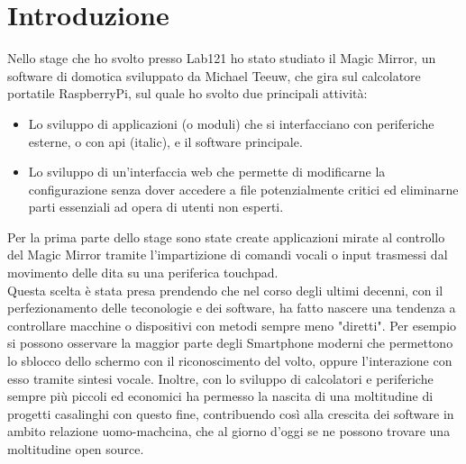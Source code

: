 \chapter*{Introduzione}

Nello stage che ho svolto presso Lab121 ho stato studiato il Magic Mirror, un software di domotica sviluppato da Michael Teeuw,
che gira sul calcolatore portatile RaspberryPi, sul quale ho svolto due principali attività:\\
\begin{itemize}
\item Lo sviluppo di applicazioni (o moduli) che si interfacciano con periferiche esterne, o con api (italic), e il software
principale.
\item Lo sviluppo di un'interfaccia web che permette di modificarne la configurazione senza dover accedere
a file potenzialmente critici ed eliminarne parti essenziali ad opera di utenti non esperti.\\[1\baselineskip]
\end{itemize}
Per la prima parte dello stage sono state create applicazioni mirate al controllo del
Magic Mirror tramite l'impartizione di comandi vocali o input trasmessi dal movimento delle dita su
una periferica touchpad.\\
Questa scelta \`e stata presa prendendo che nel corso
degli ultimi decenni, con il perfezionamento delle teconologie e dei software, ha fatto nascere
una tendenza a controllare macchine o dispositivi con metodi sempre meno "diretti".
Per esempio si possono osservare la maggior parte degli Smartphone moderni che permettono lo sblocco dello schermo con
il riconoscimento del volto, oppure l'interazione con esso tramite sintesi vocale.
Inoltre, con lo sviluppo di calcolatori e periferiche sempre più piccoli ed economici ha permesso
la nascita di una moltitudine di progetti casalinghi con questo fine, contribuendo così
alla crescita dei software in ambito relazione uomo-machcina, che al giorno d'oggi se ne possono trovare
una moltitudine open source.
\\[2\baselineskip]
